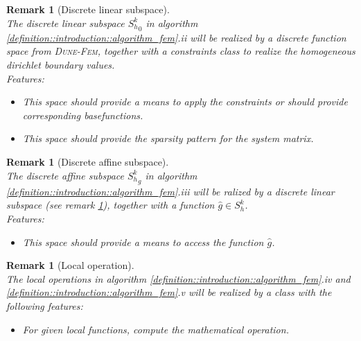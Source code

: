 \documentclass[a4paper,11pt]{article}
\numberwithin{equation}{section}
\newtheorem{remark}[definition]{Remark}
\newcommand{\theoremNewline}{\hspace{1mm}\\}
\newcommand{\theoremEndLine}{\hspace{1mm}}
\newcommand{\dunefem}{\textsc{Dune-Fem}\xspace}
\begin{document}
    \begin{remark}[Discrete linear subspace]\theoremNewline
      \label{remark::introduction::discrete_linear_subspace}
      The discrete linear subspace ${S_{h}^{k}}_{0}$ in algorithm \ref{definition::introduction::algorithm_fem}.ii
      will be realized by a discrete function space from \dunefem, together with a constraints class to realize the
      homogeneous dirichlet boundary values.\\
      Features:
      \begin{itemize}
        \item This space should provide a means to apply the constraints or should provide corresponding
          basefunctions.
        \item This space should provide the sparsity pattern for the system matrix.
      \end{itemize}
    \end{remark}\theoremEndLine

    \begin{remark}[Discrete affine subspace]\theoremNewline
      \label{remark::introduction::discrete_affine_subspace}
      The discrete affine subspace ${S_{h}^{k}}_{g}$ in algorithm \ref{definition::introduction::algorithm_fem}.iii
      will be ralized by a discrete linear subspace (see remark \ref{remark::introduction::discrete_linear_subspace}),
      together with a function ${\hat{g} \in S_h^k}$.\\
      Features:
      \begin{itemize}
        \item This space should provide a means to access the function $\hat{g}$.
      \end{itemize}
    \end{remark}\theoremEndLine

    \begin{remark}[Local operation]\theoremNewline
      \label{remark::introduction::local_operation_in_summary}
      The local operations in algorithm \ref{definition::introduction::algorithm_fem}.iv and
      \ref{definition::introduction::algorithm_fem}.v will be realized by a class with the following features:
      \begin{itemize}
        \item For given local functions, compute the mathematical operation.
      \end{itemize}
    \end{remark}\theoremEndLine
\end{document}
